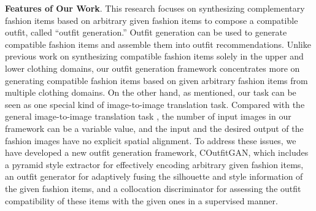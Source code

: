 \textbf{Features of Our Work}.
This research focuses on synthesizing complementary fashion items based on arbitrary given fashion items to compose a compatible outfit, called ``outfit generation.''
Outfit generation can be used to generate compatible fashion items and assemble them into outfit recommendations.
Unlike previous work on synthesizing compatible fashion items \cite{liu2019toward, liu2019collocating, yu2019personalized} solely in the upper and lower clothing domains, our outfit generation framework concentrates more on generating compatible fashion items based on given arbitrary fashion items from multiple clothing domains.
On the other hand, as mentioned, our task can be seen as one special kind of image-to-image translation task.
Compared with the general image-to-image translation task \cite{pix2pix2017, wang2018pix2pixHD, huang2018munit,CycleGAN2017,park2020cut}, the number of input images in our framework can be a variable value, and the input and the desired output of the fashion images have no explicit spatial alignment.
To address these issues, we have developed a new outfit generation framework, COutfitGAN, which includes a pyramid style extractor for effectively encoding arbitrary given fashion items, an outfit generator for adaptively fusing the silhouette and style information of the given fashion items, and a collocation discriminator for assessing the outfit compatibility of these items with the given ones in a supervised manner.